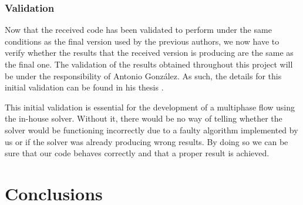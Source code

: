 \documentclass[12pt]{book}
\begin{document}
\subsection{Validation}
Now that the received code has been validated to perform under the same conditions as the final version used by the previous authors, we now have to verify whether the results that the received version is producing are the same as the final one. The validation of the results obtained throughout this project will be under the responsibility of Antonio González. As such, the details for this initial validation can be found in his thesis \cite{antonioThesis}.
\par This initial validation is essential for the development of a multiphase flow using the in-house solver. Without it, there would be no way of telling whether the solver would be functioning incorrectly due to a faulty algorithm implemented by us or if the solver was already producing wrong results. By doing so we can be sure that our code behaves correctly and that a proper result is achieved.
\chapter{Conclusions}

%

\appendix

{}

\end{document}

